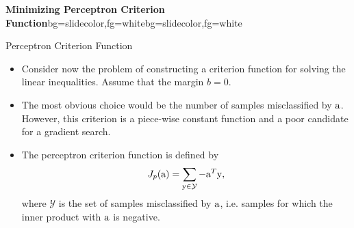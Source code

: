 {
\makeatletter
{}
\makeatother
\begin{frame}
\titlepage
\end{frame}
}



\begin{frame}{}
\begin{variableblock}{\centering \Large \textbf{\vspace{4pt}\newline Minimizing Perceptron Criterion Function\vspace{4pt}}}{bg=slidecolor,fg=white}{bg=slidecolor,fg=white}
\end{variableblock}
\end{frame}


\begin{frame}{Perceptron Criterion Function}
\begin{itemize}
\item Consider now the problem of {\color{mycolor2}constructing a criterion function} for solving the linear inequalities. Assume that
the margin $b = 0$.
\item The most obvious choice would be the {\color{mycolor2}number of
samples misclassified} by ${\rm  a}$. However, this criterion is a piece-wise constant function and a poor candidate for a gradient search.
\item The {\color{mycolor4}perceptron criterion function} is defined by
\[{J_p}({\rm a}) = \sum\limits_{{\rm y} \in \mathcal{Y}} { - {{\rm a}^T}{\rm y}}, \]
where $\mathcal{Y}$ is the set of samples misclassified by ${\rm a}$, i.e. samples for which the inner product with ${\rm a}$ is negative.
\end{itemize}
\end{frame}

